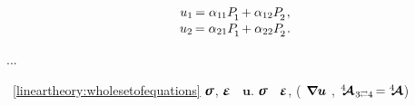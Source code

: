 \begin{minipage}{\linewidth}
\nopagebreak\vspace{-0.1em}\begin{equation*}\begin{array}{c}
u_1 \hspace{-0.22ex} = \alpha_{1\hspace{-0.1ex}1} P_{\hspace{-0.25ex}\raisemath{-0.4ex}{1}} \hspace{-0.2ex} + \alpha_{12} P_{\hspace{-0.25ex}\raisemath{-0.4ex}{2}}
\hspace{.2ex} ,
\\[.1em]
u_2 \hspace{-0.22ex} = \alpha_{21} P_{\hspace{-0.25ex}\raisemath{-0.4ex}{1}} \hspace{-0.2ex} + \alpha_{22} P_{\hspace{-0.25ex}\raisemath{-0.4ex}{2}}
\hspace{.2ex} .
\end{array}\end{equation*}

...

\end{minipage}




\label{para:equationsindisplacements.linearelasticity}
 
~\eqref{lineartheory:wholesetofequations}  $\linearstress$, $\infinitesimaldeformation$ ~$\bm{u}$.
 $\linearstress$ ~$\infinitesimaldeformation$,  
(~${\hspace{-0.2ex} \bm{\nabla}\hspace{-0.2ex} \bm{u}}$ ,  ${\stiffnesstensor_{\hspace{.12ex} 3 \scalebox{0.6}[0.8]{$\rightleftarrows$} 4} \hspace{-0.25ex} = \stiffnesstensor}$)

